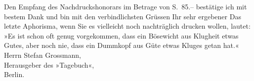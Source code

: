 \begin{ledgroupsized}[t]{13cm}
           Den Empfang des Nachdruckshonorars im Betrage von S. 85.– bestätige ich mit
                    bestem Dank und bin mit den verbindlichsten Grüssen\pend
           \pstart Ihr sehr ergebener\pend{}{\bigskip}\pstart
           \noindent{}Das letzte Aphorisma, wenn Sie es vielleicht noch nachträglich drucken
                        wollen, lautet:\pend
           \pstart
           »Es ist schon oft genug vorgekommen, dass ein Bösewicht aus Klugheit etwas
                        Gutes, aber noch nie, dass ein Dummkopf aus Güte etwas Kluges getan
                        hat.«\pend
           {\bigskip}\pstart
           \noindent{}Herrn Stefan Grossmann,{\\}Herausgeber des »Tagebuch«,{\\}Berlin.\pend
           \endnumbering{}\end{ledgroupsized}  \newcommand{\dateiname}{L02476}\newcommand{\titel}{Arthur Schnitzler an Stefan Großmann, 31. 5. 1926}\newcommand{\editorInnen}{Martin Anton Müller und Gerd-Hermann Susen}
      